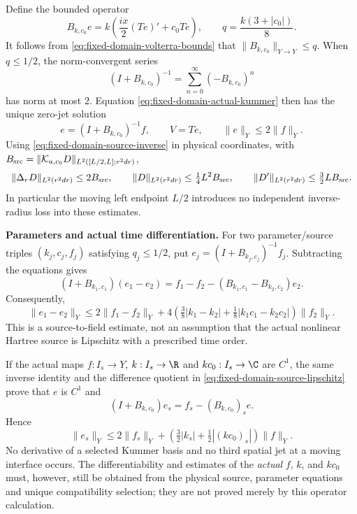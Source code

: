 Define the bounded operator
\[
 B_{k,c_0}e=k\left(\frac{ix}{2}(Te)'+c_0Te\right),\qquad
 q=\frac{k(3+|c_0|)}8.
\]
It follows from \eqref{eq:fixed-domain-volterra-bounds} that
$\|B_{k,c_0}\|_{Y\to Y}\le q$.
When $q\le1/2$, the norm-convergent series
\[
 (I+B_{k,c_0})^{-1}=\sum_{n=0}^{\infty}(-B_{k,c_0})^n
\]
has norm at most $2$.  Equation \eqref{eq:fixed-domain-actual-kummer}
then has the unique zero-jet solution
\begin{equation}
 e=(I+B_{k,c_0})^{-1}f,\qquad V=Te,\qquad
 \|e\|_Y\le2\|f\|_Y.
 \label{eq:fixed-domain-source-inverse}
\end{equation}
Using \eqref{eq:fixed-domain-source-inverse} in physical coordinates, with
$B_{\rm src}=\|\mathcal K_{a,c_0}D\|_{L^2([L/2,L];r^2dr)}$,
\[
 \|\Delta_rD\|_{L^2(r^2dr)}\le2B_{\rm src},\qquad
 \|D\|_{L^2(r^2dr)}\le\tfrac14L^2B_{\rm src},\qquad
 \|D'\|_{L^2(r^2dr)}\le\tfrac32LB_{\rm src}.
\]
In particular the moving left endpoint $L/2$ introduces no independent
inverse-radius loss into these estimates.

\medskip
\noindent\textbf{Parameters and actual time differentiation.}
For two parameter/source triples $(k_j,c_j,f_j)$ satisfying $q_j\le1/2$,
put $e_j=(I+B_{k_j,c_j})^{-1}f_j$.  Subtracting the equations gives
\[
 (I+B_{k_1,c_1})(e_1-e_2)
 =f_1-f_2-(B_{k_1,c_1}-B_{k_2,c_2})e_2.
\]
Consequently,
\begin{equation}
 \|e_1-e_2\|_Y
 \le2\|f_1-f_2\|_Y+
 4\left(\tfrac38|k_1-k_2|+
          \tfrac18|k_1c_1-k_2c_2|\right)\|f_2\|_Y.
 \label{eq:fixed-domain-source-lipschitz}
\end{equation}
This is a source-to-field estimate, not an assumption that the actual
nonlinear Hartree source is Lipschitz with a prescribed time order.

If the actual maps $f:I_s\to Y$, $k:I_s\to\R$ and
$kc_0:I_s\to\C$ are $C^1$, the same inverse identity and the difference
quotient in \eqref{eq:fixed-domain-source-lipschitz} prove that $e$ is
$C^1$ and
\[
 (I+B_{k,c_0})e_s=f_s-(B_{k,c_0})_s e.
\]
Hence
\begin{equation}
 \|e_s\|_Y\le2\|f_s\|_Y+
 \left(\tfrac32|k_s|+\tfrac12|(kc_0)_s|\right)\|f\|_Y.
 \label{eq:fixed-domain-time-source-bound}
\end{equation}
No derivative of a selected Kummer basis and no third spatial jet at a
moving interface occurs.  The differentiability and estimates of the
\emph{actual} $f$, $k$, and $kc_0$ must, however, still be obtained from
the physical source, parameter equations and unique compatibility
selection; they are not proved merely by this operator calculation.

